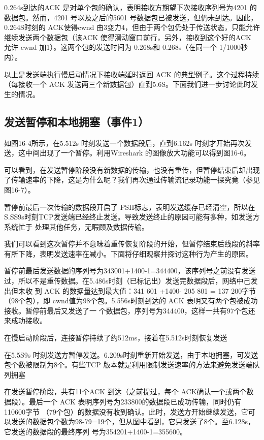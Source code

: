 0.264s到达的ACK 是对单个包的确认，表明接收方期望下次接收序列号为4201 的数据包。然而，4201 号以及之后的5601 号数据包已被发送，但仍未到达。因此，0.264S时刻的
ACK使得cwnd 由3变力4，但由于两个包仍处于传送状态，只能允许继续发送两个数据包（该ACK 使得滑动窗口前行，另外，接收到这个好的ACK 允许
cwnd 加1）。这两个包的发送时间为 0.268s和 0.268s（在同一个 1/1000秒内）。

以上是发送端执行慢启动情况下接收端延时返回 ACK 的典型例子。这个过程持续（每接收一个 ACK 发送两三个新数据包）直到5.6S。下面我们进一步讨论此时发生的情况。

\subsection{发送暂停和本地拥塞（事件1）}

如图16-4所示，在5.512s 时刻发送一个数据段后，直到6.162s 时刻才开始再次发送，这中间出现了一个暂停。利用Wireshark 的图像放大功能可以得到图16-6。

可以看到，在发送暂停阶段没有新数据的传输，也没有重传，但暂停结束后却出现了传输速率的下降，这是为什么呢？我们再次通过传输流记录功能一探究竟（参见图16-7）。

暂停前最后一次传输的数据段开启了 PSH标志，表明发送缓存已经清空，所以在S.SS9s时刻TCP发送端已经终止发送。导致发送终止的原因可能有多种，如发送方系统忙于
处理其他任务，无暇顾及数据传输。

我们可以看到这次暂停并不意味着重传恢复阶段的开始，但暂停结束后线段的斜率有所下降，表明发送速率在减小。下面将仔细观察并探讨这种行为产生的原因。

暂停前最后发送数据的序列号为343001+1400-1=344400，该序列号之前没有发送过，所以不是重传数据。在5.486s时刻（已标记出）发送完数据段后，网络中己发出但未收
到 ACK 的数据量达到最大值：341 601 +1400- 205 801 = 137 200字节（98个包），即 cwnd值为98个包。5.556s时刻到达的 ACK 表明又有两个包被成功接收。暂停前最后又发送了一
个数据包，序列号为344400，这样一共有97个包还来成功接收。

在慢启动阶段后，连接暂停持续了约512ms，接着在5.512s时刻恢复发送

在5.5S9s 时刻发送方暂停发送。6.209s时刻重新开始发送，由于本地拥塞，可发送包个数被限制为8个。有些TCP 版本就是利用限制发送速率的方法来避免发送端队列拥塞

在发送暂停阶段，共有11个ACK 到达（之前提过，每个 ACK确认一个或两个数据段）。最后一个 ACK 表明序列号为233800的数据段已成功传输，同时仍有110600字节
（79个包）的数据没有收到确认。此时，发送方开始继续发送，它可以发送的数据包个数为98-79=19个，但从图中看到，它只发送了8个。至6.128s，它发送的数据段的最终序列
号为354201+1400-1=355600。

